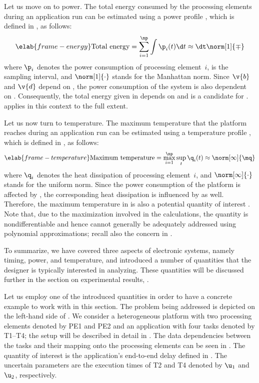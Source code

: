 Let us move on to power. The total energy consumed by the \np processing
elements during an application run can be estimated using a power profile \mp,
which is defined in , as follows:
\begin{equation} \elab{frame-energy}
  \text{Total energy}
  = \sum_{i = 1}^\np \int \p_i(t) \d t
  \approx \dt \norm[1]{\mp}
\end{equation}
where $\p_i$ denotes the power consumption of processing element~$i$, \dt is the
sampling interval, and $\norm[1]{\cdot}$ stands for the Manhattan norm. Since
$\v{b}$ and $\v{d}$ depend on \vu, the power consumption of the system is also
dependent on \vu. Consequently, the total energy given in 
depends on \vu and is a candidate for \g.  applies in
this context to the full extent.

Let us now turn to temperature. The maximum temperature that the platform
reaches during an application run can be estimated using a temperature profile
\mq, which is defined in , as follows:
\begin{equation} \elab{frame-temperature}
  \text{Maximum temperature}
  = \max_{i = 1}^\np \sup_{t} \q_i(t)
  \approx \norm[\infty]{\mq}
\end{equation}
where $\q_i$ denotes the heat dissipation of processing element~$i$, and
$\norm[\infty]{\cdot}$ stands for the uniform norm. Since the power consumption
of the platform is affected by \vu, the corresponding heat dissipation is
influenced by \vu as well. Therefore, the maximum temperature in
 is also a potential quantity of interest \g. Note that,
due to the maximization involved in the calculations, the quantity is
nondifferentiable and hence cannot generally be adequately addressed using
polynomial approximations; recall also the concern in
.

To summarize, we have covered three aspects of electronic systems, namely
timing, power, and temperature, and introduced a number of quantities that the
designer is typically interested in analyzing. These quantities will be
discussed further in the section on experimental results, .

Let us employ one of the introduced quantities in order to have a concrete
example to work with in this section. The problem being addressed is depicted on
the left-hand side of . We consider a heterogeneous
platform with two processing elements denoted by PE1 and PE2 and an application
with four tasks denoted by T1--T4; the setup will be described in detail in
. The data dependencies between the tasks and their mapping
onto the processing elements can be seen in . The
quantity of interest \g is the application's end-to-end delay defined in
. The uncertain parameters \vu are the execution times of T2
and T4 denoted by $\u_1$ and $\u_2$, respectively.

